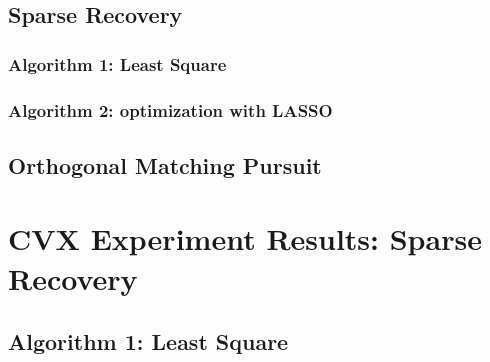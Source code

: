 \documentclass[11pt,a4paper]{report}
\begin{document}
\section{Sparse Recovery}
\subsection{Algorithm 1: Least Square}

\newpage
\subsection{Algorithm 2: optimization with LASSO}

\newpage

\section{Orthogonal Matching Pursuit}

\chapter{CVX Experiment Results: Sparse Recovery}

\section{Algorithm 1: Least Square}
\end{document}
